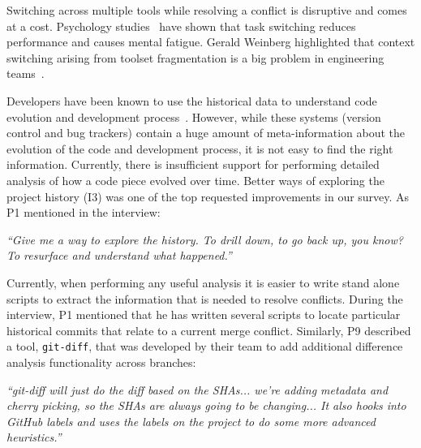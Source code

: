 Switching across multiple tools while resolving a conflict is disruptive and comes at a cost. Psychology studies~\cite{Meiran2000}\cite{gopher2000switching} have shown that task switching reduces performance and causes mental fatigue. 
Gerald Weinberg highlighted that context switching arising from toolset fragmentation is a big problem in engineering teams~\cite{Weinberg1992}. 


Developers have been known to use the historical data to understand code evolution and development process~\cite{mihai_lenses}.
However, while these systems (version control and bug trackers) contain a huge amount of meta-information about the evolution of the code and development process, it is not easy to find the right information. Currently, there is insufficient support for performing detailed analysis of how a code piece evolved over time. Better ways of exploring the project history (I3) was one of the top requested improvements in our survey. As P1 mentioned in the interview:
\begin{displayquote}
\textit{``Give me a way to explore the history. To drill down, to go back up, you know? To resurface and understand what happened.''}
\end{displayquote}


Currently, when performing any useful analysis it is easier to write stand alone scripts to extract the information that is needed to resolve conflicts. During the interview, P1 mentioned that he has written several scripts to locate particular historical commits that relate to a current merge conflict. Similarly, P9 described a tool, \texttt{git-diff}, that was developed by their team to add additional difference analysis functionality across branches:
\begin{displayquote}
\textit{``git-diff will just do the diff based on the SHAs... we're adding metadata and cherry picking, so the SHAs are always going to be changing... It also hooks into GitHub labels and uses the labels on the project to do some more advanced heuristics.''}
\end{displayquote}

